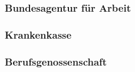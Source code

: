 \subsubsection{Bundesagentur für Arbeit} \label{bundesagenturFuerArbeit}

\subsubsection{Krankenkasse} \label{krankenkasse}

\subsubsection{Berufsgenossenschaft} \label{berufsgenossenschaft}
